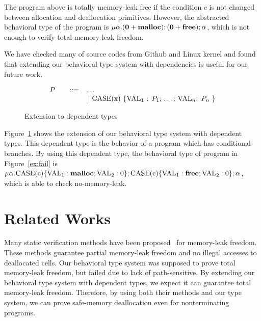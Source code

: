 \documentclass{sigplanconf}
\begin{document}
The program above is totally memory-leak free if the condition \(c\) is
not changed between allocation and deallocation primitives. However,
the abstracted behavioral type of the program is
\(\mu\alpha. (\mathbf{0} + \mathbf{malloc}); (\mathbf{0} + \mathbf{free}); \alpha\),
which is not enough to verify total memory-leak freedom.

We have checked many of source codes from Github and Linux kernel and
found that extending our behavioral type system with dependencies is
useful for our future work.

\begin{figure}[h]
  \[
  \begin{array}{rlcl}
  P &  &::=& \ldots \\
  & & &\;|\; \mbox{CASE(x) \{VAL\(_1\) : $P_1$; \ldots ; VAL\(_n\): $P_n$  \}}\\
\end{array}
\]
\caption{Extension to dependent types}
\label{ex:beh}
\end{figure}

Figure~\ref{ex:beh} shows the extension of our behavioral type
system with dependent types. This dependent type is the behavior of a
program which has conditional branches. By using this dependent type,
the behavioral type of program in Figure~\ref{ex:fail} is
\(\mu\alpha.\mbox{CASE(c)}\{\mbox{VAL}_1:\mathbf{malloc};\mbox{VAL}_2:0
\};\mbox{CASE(c)}\{ \mbox{VAL}_1:\mathbf{free};\mbox{VAL}_2:0 \};
\alpha\), which is able to check no-memory-leak.

\section{Related Works}
Many static verification methods have been
proposed~\cite{DBLP:conf/aplas/SuenagaK09,DBLP:conf/pldi/HeineL03,DBLP:conf/sigsoft/XieA05,DBLP:journals/scp/SwamyHMGJ06,DBLP:conf/sas/OrlovichR06,DBLP:conf/issta/SuiYX12}
for memory-leak freedom. These methods guarantee partial memory-leak
freedom and no illegal accesses to deallocated cells.  Our behavioral
type system was supposed to prove total memory-leak freedom, but
failed due to lack of path-sensitive. By extending our behavioral type
system with dependent types, we expect it can guarantee total
memory-leak freedom.  Therefore, by using both their methods and our
type system, we can prove safe-memory deallocation even for
nonterminating programs.
\end{document}
